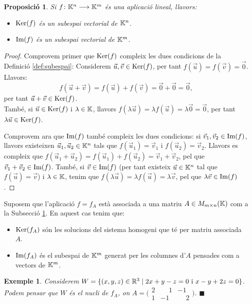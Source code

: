 \documentclass[
  11pt,
]{book}
\numberwithin{dummy}{section}
\theoremstyle{maincolornumbox}
\theoremstyle{blacknumex}
\newtheorem{exampleT}{Exemple}[chapter]
\theoremstyle{blacknumbox}
\theoremstyle{maincolornum}
\newtheorem{propositionT}{Proposició}[chapter]
\newenvironment{proposition}{\begin{pBox}\begin{propositionT}}{\end{propositionT}\end{pBox}}
\newenvironment{example}{\begin{exampleT}}{\hfill{\tiny\ensuremath{\blacksquare}}\end{exampleT}}
\newlength\esp
\begin{document}
\begin{proposition}

Si \(f \colon \mathbb{K}^n \longrightarrow \mathbb{K}^m\) és una aplicació lineal, llavors:

\begin{itemize}
\item
  \(\operatorname{Ker}(f)\) és un subespai vectorial de \(\mathbb{K}^n\).
\item
  \(\operatorname{Im}(f)\) és un subespai vectorial de \(\mathbb{K}^m\).
\end{itemize}

\end{proposition}

\begin{proof}
Comprovem primer que \(\operatorname{Ker}(f)\) compleix les dues condicions de
la Definició \ref{def:subespai}: Considerem \(\vec u, \vec v \in \operatorname{Ker}(f)\), per
tant \(f(\vec u)=f(\vec v)=\vec 0\). Llavors:
\[f(\vec u+\vec v)=f(\vec u)+f(\vec v)=\vec 0+\vec 0 =\vec 0 ,\] per
tant \(\vec u+\vec v \in \operatorname{Ker}(f)\).\\
També, si \(\vec u \in \operatorname{Ker}(f)\) i \(\lambda\in\mathbb{K}\), llavors
\(f(\lambda \vec u)=\lambda f(\vec u)=\lambda \vec 0=\vec 0\), per tant
\(\lambda \vec u\in\operatorname{Ker}(f)\).

Comprovem ara que \(\operatorname{Im}(f)\) també compleix les dues condicions: si
\(\vec v_1,\vec v_2 \in\operatorname{Im}(f)\), llavors existeixen
\(\vec u_1, \vec u_2 \in \mathbb{K}^n\) tals que \(f(\vec u_1)=\vec v_1\) i
\(f(\vec u_2)=\vec v_2\). Llavors es compleix que
\(f(\vec u_1+\vec u_2)=f(\vec u_1)+f(\vec u_2)=\vec v_1+\vec v_2\), pel
que \(\vec v_1+\vec v_2 \in \operatorname{Im}(f)\). També, si \(\vec v\in \operatorname{Im}(f)\) (per
tant existeix \(\vec u\in \mathbb{K}^n\) tal que \(f(\vec u)=\vec v\)) i
\(\lambda\in\mathbb{K}\), tenim que
\(f(\lambda \vec u)=\lambda f(\vec u)=\lambda \vec v\), pel que
\(\lambda \vec v \in \operatorname{Im}(f)\).
\end{proof}

Suposem que l'aplicació \(f=f_A\) està associada a una matriu
\(A\in M_{m\times n}(\mathbb{K})\) com a la Subsecció
\hyperref[subsec:matriusapl]{1}. En aquest cas tenim que:

\begin{itemize}
\item
  \(\operatorname{Ker}(f_A)\) són les solucions del sistema homogeni que té per matriu
  associada \(A\).
\item
  \(\operatorname{Im}(f_A)\) és el subespai de \(\mathbb{K}^m\) generat per les columnes d'\(A\)
  pensades com a vectors de \(\mathbb{K}^m\).
\end{itemize}

\begin{example}
Considerem \(W=\{(x,y,z)\in\mathbb{R}^3 \mid 2x+y-z=0 \text{ i } x -y +2z=0\}\).
Podem pensar que \(W\) és el nucli de \(f_A\), on
\(A=\big(\begin{smallmatrix} 2 & \phantom{-}1 & -1 \\ 1 & -1 & \phantom{-}2\end{smallmatrix}\big)\).
\end{example}
\end{document}
